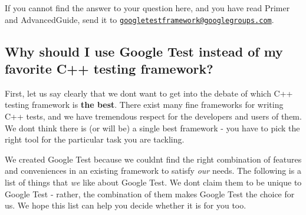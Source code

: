 If you cannot find the answer to your question here, and you have read Primer and Advanced\+Guide, send it to \href{mailto:googletestframework@googlegroups.com}{\tt googletestframework@googlegroups.\+com}.

\subsection*{Why should I use Google Test instead of my favorite C++ testing framework?}

First, let us say clearly that we don\textquotesingle{}t want to get into the debate of which C++ testing framework is {\bfseries the best}. There exist many fine frameworks for writing C++ tests, and we have tremendous respect for the developers and users of them. We don\textquotesingle{}t think there is (or will be) a single best framework -\/ you have to pick the right tool for the particular task you are tackling.

We created Google Test because we couldn\textquotesingle{}t find the right combination of features and conveniences in an existing framework to satisfy {\itshape our} needs. The following is a list of things that {\itshape we} like about Google Test. We don\textquotesingle{}t claim them to be unique to Google Test -\/ rather, the combination of them makes Google Test the choice for us. We hope this list can help you decide whether it is for you too.


